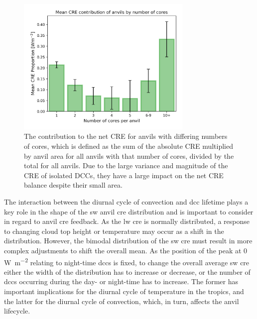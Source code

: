 \begin{figure}[tp]
    \centering
    \includegraphics[width=0.75\textwidth]{figures/chapter4_17.png}
    \caption[
    The contribution to the net CRE for anvils with differing numbers of cores
    ]{
    The contribution to the net CRE for anvils with differing numbers of cores, which is defined as the sum of the absolute CRE multiplied by anvil area for all anvils with that number of cores, divided by the total for all anvils. Due to the large variance and magnitude of the CRE of isolated DCCs, they have a large impact on the net CRE balance despite their small area. 
    }
    \label{fig:S_contribution_to_net_cre}
\end{figure}

The interaction between the diurnal cycle of convection and \acrshort{dcc} lifetime plays a key role in the shape of the \acrshort{sw} anvil \acrshort{cre} distribution and is important to consider in regard to anvil \acrshort{cre} feedback. 
As the \acrshort{lw} \acrshort{cre} is normally distributed, a response to changing cloud top height or temperature may occur as a shift in the distribution. 
However, the bimodal distribution of the \acrshort{sw} \acrshort{cre} must result in more complex adjustments to shift the overall mean. 
As the position of the peak at 0 \,\unit{W m^{-2}} relating to night-time \acrshort{dcc}s is fixed, to change the overall average \acrshort{sw} \acrshort{cre} either the width of the distribution has to increase or decrease, or the number of \acrshort{dcc}s occurring during the day- or night-time has to increase. 
The former has important implications for the diurnal cycle of temperature in the tropics, and the latter for the diurnal cycle of convection, which, in turn, affects the anvil lifecycle.

